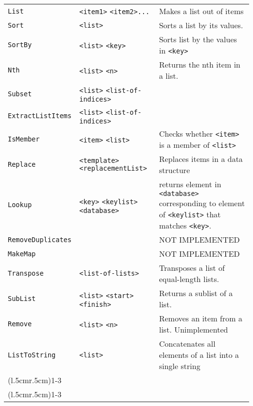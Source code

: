 \begin{longtable}{p{3cm}p{3cm}p{6cm}}
\verb+List+ &\verb+<item1>+ \verb+<item2>...+ &Makes a list out of items\\ 
\verb+Sort+ &\verb+<list>+ &Sorts a list by its values. \\ 
\verb+SortBy+ &\verb+<list>+ \verb+<key>+ & Sorts list by the values in \verb+<key>+ \\ 
\verb+Nth+ &\verb+<list>+ \verb+<n>+ &Returns the nth item in a list.\\ 
\verb+Subset+ &\verb+<list>+ \verb+<list-of-indices>+ & \\ 
\verb+ExtractListItems+ &\verb+<list>+ \verb+<list-of-indices>+ & \\ 
\verb+IsMember+ &\verb+<item>+ \verb+<list>+ & Checks whether \verb+<item>+ is a member of \verb+<list>+ \\ 
\verb+Replace+ &\verb+<template>+ \verb+<replacementList>+ & Replaces items in a data structure\\ 
\verb+Lookup+& \verb+<key>+ \verb+<keylist>+ \verb+<database>+&returns
element in \verb+<database>+ corresponding to element of
\verb+<keylist>+ that matches \verb+<key>+.\\
\verb+RemoveDuplicates+ & & NOT IMPLEMENTED\\ 
\verb+MakeMap+ & & NOT IMPLEMENTED\\ 
\verb+Transpose+ &\verb+<list-of-lists>+ &Transposes a list of equal-length lists.\\ 
\verb+SubList+ &\verb+<list>+ \verb+<start>+ \verb+<finish>+ & Returns a sublist of a list.\\ 
\verb+Remove+ &\verb+<list>+ \verb+<n>+ & Removes an item from a list. Unimplemented\\ 
\verb+ListToString+ &\verb+<list>+ & Concatenates all elements of a list into a single string\\

\addlinespace[0.2cm] 
\cmidrule(l{.5cm}r{.5cm}){1-3} 
\multicolumn{3}{c}{\textbf{String Management Functions}}\\ 
\cmidrule(l{.5cm}r{.5cm}){1-3} 


\end{longtable}
